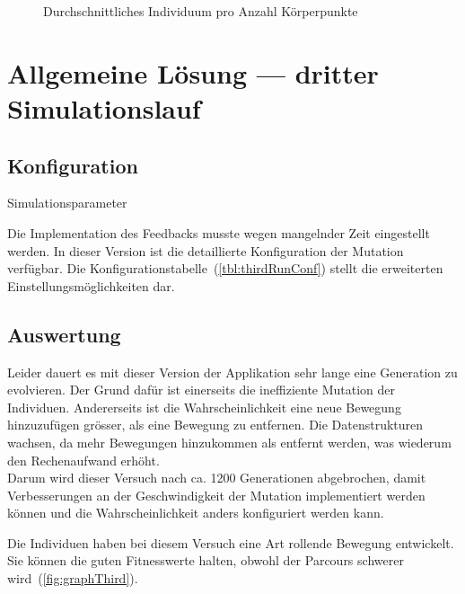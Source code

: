         \begin{figure}[H]
          \centering
          
          \caption{Durchschnittliches Individuum pro Anzahl Körperpunkte\label{fig:graphBpSecond}}
        \end{figure}

  \section{Allgemeine Lösung --- dritter Simulationslauf}

    \subsection{Konfiguration}

      \begin{table}[H]
        \centering
        
        \caption{Simulationsparameter\label{tbl:thirdRunConf}}
      \end{table}

      Die Implementation des Feedbacks musste wegen mangelnder Zeit eingestellt werden.
      In dieser Version ist die detaillierte Konfiguration der Mutation verfügbar.
      Die Konfigurationstabelle~(\vref{tbl:thirdRunConf}) stellt die erweiterten Einstellungsmöglichkeiten dar.

    \subsection{Auswertung\label{sub:thirdAuswertung}}

      Leider dauert es mit dieser Version der Applikation sehr lange eine Generation zu evolvieren.
      Der Grund dafür ist einerseits die ineffiziente Mutation der Individuen.
      Andererseits ist die Wahrscheinlichkeit eine neue Bewegung hinzuzufügen grösser, als eine Bewegung zu entfernen.
      Die Datenstrukturen wachsen, da mehr Bewegungen hinzukommen als entfernt werden,
      was wiederum den Rechenaufwand erhöht.
      \\
      Darum wird dieser Versuch nach ca. 1200 Generationen abgebrochen,
      damit Verbesserungen an der Geschwindigkeit der Mutation implementiert werden können und
      die Wahrscheinlichkeit anders konfiguriert werden kann.

      \medskip

      Die Individuen haben bei diesem Versuch eine Art rollende Bewegung entwickelt.
      Sie können die guten Fitnesswerte halten,
      obwohl der Parcours schwerer wird~(\vref{fig:graphThird}).

